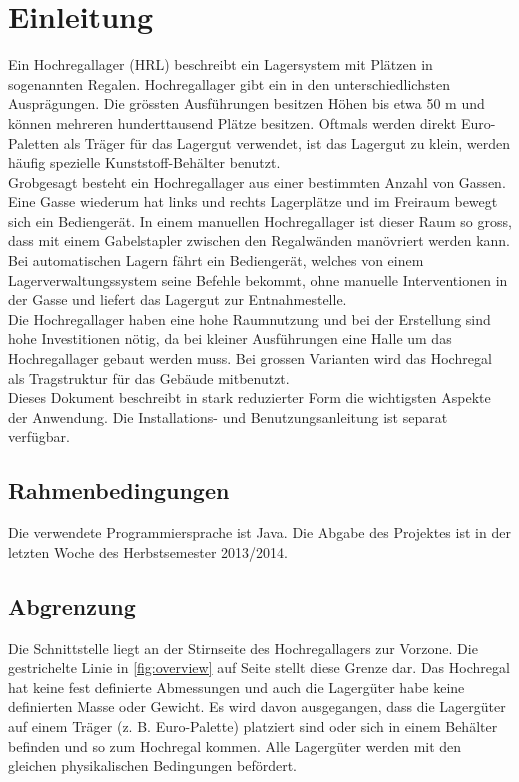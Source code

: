 \section{Einleitung}
Ein Hochregallager (HRL) beschreibt ein Lagersystem mit Plätzen in sogenannten Regalen. Hochregallager gibt ein in den unterschiedlichsten Ausprägungen. Die grössten Ausführungen besitzen Höhen bis etwa 50 m und können mehreren hunderttausend Plätze besitzen. Oftmals werden direkt Euro-Paletten als Träger für das Lagergut verwendet, ist das Lagergut zu klein, werden häufig spezielle Kunststoff-Behälter benutzt.\\
Grobgesagt besteht ein Hochregallager aus einer bestimmten Anzahl von Gassen. Eine Gasse wiederum hat links und rechts Lagerplätze und im Freiraum bewegt sich ein Bediengerät. In einem manuellen Hochregallager ist dieser Raum so gross, dass mit einem Gabelstapler zwischen den Regalwänden manövriert werden kann. Bei automatischen Lagern fährt ein Bediengerät, welches von einem Lagerverwaltungssystem seine Befehle bekommt, ohne manuelle Interventionen in der Gasse und liefert das Lagergut zur Entnahmestelle.\\
Die Hochregallager haben eine hohe Raumnutzung und bei der Erstellung sind hohe Investitionen nötig, da bei kleiner Ausführungen eine Halle um das Hochregallager gebaut werden muss. Bei grossen Varianten wird das Hochregal als Tragstruktur für das Gebäude mitbenutzt.\\
Dieses Dokument beschreibt in stark reduzierter Form die wichtigsten Aspekte der Anwendung. Die Installations- und Benutzungsanleitung ist separat verfügbar.
%
\subsection{Rahmenbedingungen}
Die verwendete Programmiersprache ist Java. Die Abgabe des Projektes ist in der letzten Woche des Herbstsemester 2013/2014.
%
\subsection{Abgrenzung}
Die Schnittstelle liegt an der Stirnseite des Hochregallagers zur Vorzone. Die gestrichelte Linie in \ref{fig:overview} auf Seite \pageref{fig:overview} stellt diese Grenze dar. Das Hochregal hat keine fest definierte Abmessungen und auch die Lagergüter habe keine definierten Masse oder Gewicht. Es wird davon ausgegangen, dass die Lagergüter auf einem Träger (z. B. Euro-Palette) platziert sind oder sich in einem Behälter befinden und so zum Hochregal kommen. Alle Lagergüter werden mit den gleichen physikalischen Bedingungen befördert.\\ 
